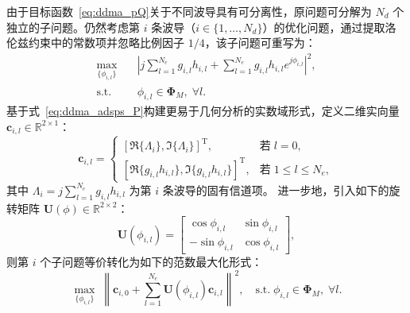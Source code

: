 由于目标函数~\eqref{eq:ddma_pQ}关于不同波导具有可分离性，原问题可分解为 $N_d$ 个独立的子问题。仍然考虑第 $i$ 条波导（$i \in \{1, \dots, N_d\}$）的优化问题，通过提取洛伦兹约束中的常数项并忽略比例因子 $1/4$，该子问题可重写为：
\begin{align}\label{eq:ddma_adsps_P}
	\max_{\{\phi_{i,l}\}} \quad &\left|j \sum_{l=1}^{N_{e}} g_{i,l} h_{i,l} + \sum_{l=1}^{N_{e}} g_{i, l} h_{i, l} e^{j \phi_{i,l}} \right|^{2}, \\
	\text{s.t.} \quad &\phi_{i,l} \in \bm \Phi_M,\; \forall l.
\end{align}
基于式~\eqref{eq:ddma_adsps_P}构建更易于几何分析的实数域形式，定义二维实向量 $\bm c_{i,l} \in \mathbb R^{2 \times 1}$：
\begin{equation}\label{eq:ddma_adsps_c}
	\bm c_{i,l} =
	\begin{cases}
		[\Re\{\Lambda_i\},\Im\{\Lambda_i\}]^\mathrm T,&\text{若}\; l=0, \\
		[\Re\{g_{i,l} h_{i,l}\},\Im\{g_{i,l} h_{i,l}\}]^\mathrm T,&  \text{若}\; 1\le l \le N_e,
	\end{cases}
\end{equation}
其中 $\Lambda_i = j \sum_{l=1}^{N_{e}} g_{i,l} h_{i,l}$ 为第 $i$ 条波导的固有信道项。
进一步地，引入如下的旋转矩阵 $\bm{U}(\phi) \in \mathbb{R}^{2 \times 2}$：
\begin{equation}\label{eq:ddma_adsps_U}
	\bm{U}(\phi_{i,l}) = \begin{bmatrix} \cos\phi_{i,l} & \sin\phi_{i,l} \\ -\sin\phi_{i,l} & \cos\phi_{i,l} \end{bmatrix},
\end{equation}
则第 $i$ 个子问题等价转化为如下的范数最大化形式：
\begin{equation}\label{eq:ddma_adsps_PU}
	\max_{\{\phi_{i,l}\}} \; \left\|\bm{c}_{i,0} + \sum_{l=1}^{N_e} \bm{U}(\phi_{i,l}) \bm{c}_{i,l}\right\|^2,
	\quad \text{s.t.} \; \phi_{i,l} \in \bm \Phi_M,\; \forall l.
\end{equation}

